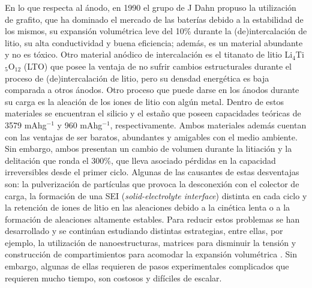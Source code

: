 En lo que respecta al ánodo, en 1990 el grupo de J Dahn \cite{fong1990} propuso 
la utilización de grafito, que ha dominado el mercado de las baterías debido a
la estabilidad de los mismos, su expansión volumétrica leve del 10\% durante 
la (de)intercalación de litio, su alta conductividad y buena eficiencia; además, 
es un material abundante y no es tóxico. Otro material anódico de intercalación 
es el titanato de litio Li$_4$Ti$_5$O$_{12}$ (LTO) que posee la ventaja de 
no sufrir cambios estructurales durante el proceso de (de)intercalación de litio, 
pero su densdad energética es baja comparada a otros ánodos. Otro proceso que
puede darse en los ánodos durante su carga es la aleación de los iones de litio 
con algún metal. Dentro de estos materiales se encuentran el silicio y el estaño
que poseen capacidades teóricas de 3579 mAhg$^{-1}$ y 960 mAhg$^{-1}$, 
respectivamente. Ambos materiales además cuentan con las ventajas de ser baratos,
abundantes y amigables con el medio ambiente. Sin embargo, ambos presentan un 
cambio de volumen durante la litiación y la delitación que ronda el 300\%, que 
lleva asociado pérdidas en la capacidad irreversibles desde el primer ciclo.
Algunas de las causantes de estas desventajas son: la pulverización de 
partículas que provoca la desconexión con el colector de carga, la formación de 
una SEI (\textit{solid-electrolyte interface}) distinta en cada ciclo y la 
retención de iones de litio en las aleaciones debido a la cinética lenta o a la
formación de aleaciones altamente estables. Para reducir estos problemas se 
han desarrollado y se continúan estudiando distintas estrategias, entre ellas,
por ejemplo, la utilización de nanoestructuras, matrices para disminuir la 
tensión y construcción de compartimientos para acomodar la expansión 
volumétrica \cite{zuo2016}. Sin embargo, algunas de ellas requieren de pasos 
experimentales complicados que requieren mucho tiempo, son costosos y difíciles
de escalar.

